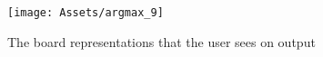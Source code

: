 \begin{figure}[b]
	\centering
	\texttt{[image: Assets/argmax\_9]}
	\caption{ The board representations that the user sees on output }
	\label{fig:argmax_10}
\end{figure}